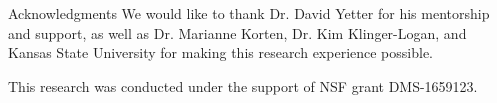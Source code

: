 \documentclass[10pt]{beamer}
\newcommand{\gen}[1]{\langle#1\rangle} %
\newcommand{\sq}{\preccurlyeq} %
\newcommand{\Inn}{\mathrm{Inn}} %
\theoremstyle{plain}
\begin{document}











    
\begin{frame}{Acknowledgments}
   We would like to thank Dr. David Yetter for his mentorship and support, as well as  Dr. Marianne Korten, Dr. Kim Klinger-Logan, and Kansas State University for making this research experience possible.
   
   \vspace{0.25in}
   
   This research was conducted under the support of NSF grant DMS-1659123.
 \end{frame}
\end{document}
